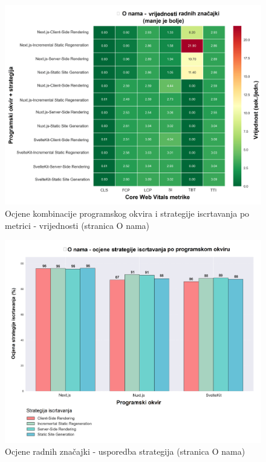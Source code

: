 \begin{figure}[H]
    \centering
    \includegraphics[width=\textwidth]{slike/rezultati/about/about_performance_values.png}
    \caption{Ocjene kombinacije programskog okvira i strategije iscrtavanja po metrici - vrijednosti (stranica O nama)}
    \label{fig:testiranje-o-nama-vrijednosti}
\end{figure}

\begin{figure}[H]
    \centering
    \includegraphics[width=\textwidth]{slike/rezultati/about/about_strategy_comparison.png}
    \caption{Ocjene radnih značajki - usporedba strategija (stranica O nama)}
    \label{fig:testiranje-o-nama-usporedba-strategija}
\end{figure}

